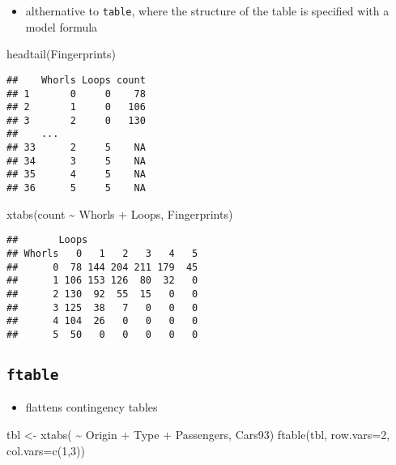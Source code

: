 \documentclass[
]{book}
\newenvironment{Shaded}{\begin{snugshade}}{\end{snugshade}}
\newcommand{\AttributeTok}[1]{\textcolor[rgb]{0.77,0.63,0.00}{#1}}
\newcommand{\DecValTok}[1]{\textcolor[rgb]{0.00,0.00,0.81}{#1}}
\newcommand{\FunctionTok}[1]{\textcolor[rgb]{0.00,0.00,0.00}{#1}}
\newcommand{\NormalTok}[1]{#1}
\newcommand{\OtherTok}[1]{\textcolor[rgb]{0.56,0.35,0.01}{#1}}
\newcommand{\SpecialCharTok}[1]{\textcolor[rgb]{0.00,0.00,0.00}{#1}}
\providecommand{\tightlist}{%
  \setlength{\itemsep}{0pt}\setlength{\parskip}{0pt}}
\theoremstyle{definition}
\theoremstyle{definition}
\theoremstyle{definition}
\theoremstyle{definition}
\theoremstyle{remark}
\begin{document}
\begin{itemize}
\tightlist
\item
  althernative to \texttt{table}, where the structure of the table is specified with a model formula
\end{itemize}

\begin{Shaded}
\begin{Highlighting}[]
\FunctionTok{headtail}\NormalTok{(Fingerprints)}
\end{Highlighting}
\end{Shaded}

\begin{verbatim}
##    Whorls Loops count
## 1       0     0    78
## 2       1     0   106
## 3       2     0   130
##    ...
## 33      2     5    NA
## 34      3     5    NA
## 35      4     5    NA
## 36      5     5    NA
\end{verbatim}

\begin{Shaded}
\begin{Highlighting}[]
\FunctionTok{xtabs}\NormalTok{(count }\SpecialCharTok{\textasciitilde{}}\NormalTok{ Whorls }\SpecialCharTok{+}\NormalTok{ Loops, Fingerprints)}
\end{Highlighting}
\end{Shaded}

\begin{verbatim}
##       Loops
## Whorls   0   1   2   3   4   5
##      0  78 144 204 211 179  45
##      1 106 153 126  80  32   0
##      2 130  92  55  15   0   0
##      3 125  38   7   0   0   0
##      4 104  26   0   0   0   0
##      5  50   0   0   0   0   0
\end{verbatim}

\hypertarget{ftable}{%
\subsection{\texorpdfstring{\texttt{ftable}}{ftable}}\label{ftable}}

\begin{itemize}
\tightlist
\item
  flattens contingency tables
\end{itemize}

\begin{Shaded}
\begin{Highlighting}[]
\NormalTok{tbl }\OtherTok{\textless{}{-}} \FunctionTok{xtabs}\NormalTok{( }\SpecialCharTok{\textasciitilde{}}\NormalTok{ Origin }\SpecialCharTok{+}\NormalTok{ Type }\SpecialCharTok{+}\NormalTok{ Passengers, Cars93)}
\FunctionTok{ftable}\NormalTok{(tbl, }\AttributeTok{row.vars=}\DecValTok{2}\NormalTok{, }\AttributeTok{col.vars=}\FunctionTok{c}\NormalTok{(}\DecValTok{1}\NormalTok{,}\DecValTok{3}\NormalTok{))}
\end{Highlighting}
\end{Shaded}
\end{document}
